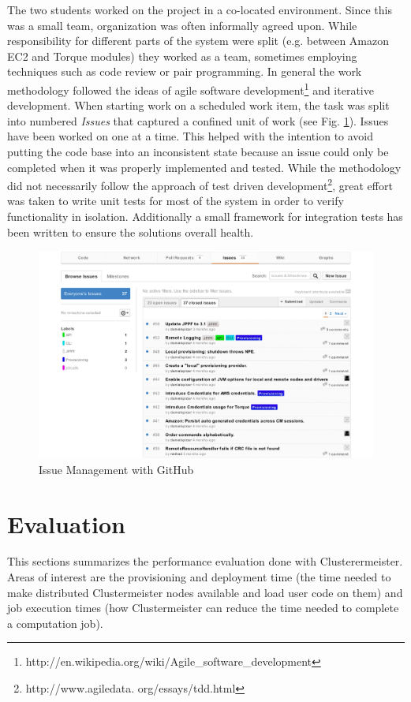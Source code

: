 \documentclass[english]{uzhpub}
\begin{document}
The two students worked on the project in a co-located environment. Since this was a small team, organization was often informally agreed upon. While responsibility for different parts of the system were split (e.g. between Amazon EC2 and Torque modules) they worked as a team, sometimes employing techniques such as code review or pair programming. In general the work methodology followed the ideas of agile software development\footnote{http://en.wikipedia.org/wiki/Agile\_software\_development} and iterative development. When starting work on a scheduled work item, the task was split into numbered \emph{Issues} that captured a confined unit of work (see Fig. \ref{fig:issues}). Issues have been worked on one at a time. This helped with the intention to avoid putting the code base into an inconsistent state because an issue could only be completed when it was properly implemented and tested. While the methodology did not necessarily follow the approach of test driven development\footnote{http://www.agiledata.
org/essays/tdd.html}, great effort was taken to write unit tests for most of the system in order 
to verify functionality in isolation. Additionally a small framework for integration tests has been written to ensure the solutions overall health.

\begin{figure}[hptb]
\centering
\includegraphics[scale=0.7]{images/github-issues.pdf}
\caption{Issue Management with GitHub}
\label{fig:issues}
\end{figure}

\section{Evaluation}
This sections summarizes the performance evaluation done with Clusterermeister. Areas of interest are the provisioning and deployment time (the time needed to make distributed Clustermeister nodes available and load user code on them) and job execution times (how Clustermeister can reduce the time needed to complete a computation job). 
\end{document}
